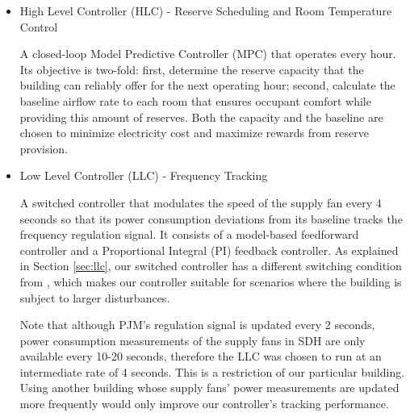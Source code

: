 \begin{itemize}
	\item{High Level Controller (HLC) - Reserve Scheduling and Room Temperature Control}\label{sec:high_level}

A closed-loop Model Predictive Controller (MPC) that operates every hour. Its objective is two-fold: first, determine the reserve capacity that the building can reliably offer for the next operating hour; second, calculate the baseline airflow rate to each room that ensures occupant comfort while providing this amount of reserves.
Both the capacity and the baseline are chosen to minimize electricity cost and maximize rewards from reserve provision.

	\item{Low Level Controller (LLC) - Frequency Tracking}\label{sec:low_level}

A switched controller that modulates the speed of the supply fan every 4 seconds so that its power consumption deviations from its baseline tracks the frequency regulation signal.
It consists of a model-based feedforward controller and a Proportional Integral (PI) feedback controller.
As explained in Section \ref{sec:llc}, our switched controller has a different switching condition from \cite{Vrettos:2016flexlab1}, which makes our controller suitable for scenarios where the building is subject to larger disturbances.  

Note that although PJM's regulation signal is updated every 2 seconds, power consumption measurements of the supply fans in SDH are only available every 10-20 seconds, therefore the LLC was chosen to run at an intermediate rate of 4 seconds. This is a restriction of our particular building. Using another building whose supply fans' power measurements are updated more frequently would only improve our controller's tracking performance.
\end{itemize}


